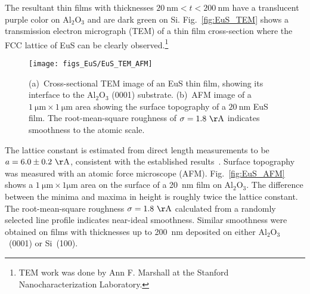 The resultant thin films with thicknesses $20~\mathrm{nm}<t<200~\mathrm{nm}$ have a translucent purple color on Al$_2$O$_3$ and are dark green on Si. Fig.~\ref{fig:EuS_TEM} shows a transmission electron micrograph (TEM) of a thin film cross-section where the FCC lattice of EuS can be clearly observed.\footnote{TEM work was done by Ann F. Marshall at the Stanford Nanocharacterization Laboratory.} %
%
\begin{figure}[ht]%
    \subfloat{\label{fig:EuS_TEM}}%
    \subfloat{\label{fig:EuS_AFM}}%
    \centering%
    \texttt{[image: figs\_EuS/EuS\_TEM\_AFM]}%
    \caption[Micrographs of the cross-section and of the surface of an EuS thin film]{\label{fig:EuS_TEM_AFM}(a)~Cross-sectional TEM image of an EuS thin film, showing its interface to the Al$_2$O$_3$ (0001) substrate. (b)~AFM image of a $1~\mathrm{\mu{}m}\times{}1~\mathrm{\mu{}m}$ area showing the surface topography of a $20~\mathrm{nm}$ EuS film. The root-mean-square roughness of $\sigma=1.8~\mathrm\AA$ indicates smoothness to the atomic scale.}%
\end{figure}%
%
The lattice constant is estimated from direct length measurements to be $a=6.0\pm0.2~\mathrm\AA$, consistent with the established results~\cite{EuS_Shafer}. Surface topography was measured with an atomic force microscope (AFM). Fig.~\ref{fig:EuS_AFM} shows a $1~\mathrm{\mu{}m}\times{}1\mathrm{\mu{}m}$ area on the surface of a 20~nm film on Al$_2$O$_3$. The difference between the minima and maxima in height is roughly twice the lattice constant. The root-mean-square roughness $\sigma=1.8~\mathrm\AA$ calculated from a randomly selected line profile indicates near-ideal smoothness. Similar smoothness were obtained on films with thicknesses up to 200~nm deposited on either Al$_2$O$_3$~(0001) or Si~(100).

